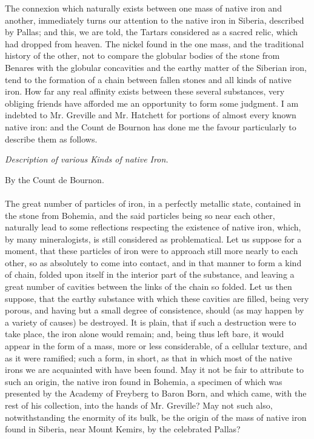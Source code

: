 \documentclass[a4paper, 12pt, oneside, twocolumn]{article}
\begin{document}
The connexion which naturally exists between one mass of native iron and another, immediately turns our attention to the native iron in Siberia, described by Pallas; and this, we are told, the Tartars considered as a sacred relic, which had dropped from heaven. The nickel found in the one mass, and the traditional history of the other, not to compare the globular bodies of the stone from Benares with the globular concavities and the earthy matter of the Siberian iron, tend to the formation of a chain between fallen stones and all kinds of native iron. How far any real affinity exists between these several substances, very obliging friends have afforded me an opportunity to form some judgment. I am indebted to Mr. Greville and Mr. Hatchett for portions of almost every known native iron: and the Count de Bournon has done me the favour particularly to describe them as follows.
\begin{center}
\emph{Description of various Kinds of native Iron.}
\end{center}
\begin{center}
By the Count de Bournon.
\end{center}
\paragraph{}
The great number of particles of iron, in a perfectly metallic state, contained in the stone from Bohemia, and the said particles being so near each other, naturally lead to some reflections respecting the existence of native iron, which, by many mineralogists, is still considered as problematical. Let us suppose for a moment, that these particles of iron were to approach still more nearly to each other, so as absolutely to come into contact, and in that manner to form a kind of chain, folded upon itself in the interior part of the substance, and leaving a great number of cavities between the links of the chain so folded. Let us then suppose, that the earthy substance with which these cavities are filled, being very porous, and having but a small degree of consistence, should (as may happen by a variety of causes) be destroyed. It is plain, that if such a destruction were to take place, the iron alone would remain; and, being thus left bare, it would appear in the form of a mass, more or less considerable, of a cellular texture, and as it were ramified; such a form, in short, as that in which most of the native irons we are acquainted with have been found. May it not be fair to attribute to such an origin, the native iron found in Bohemia, a specimen of which was presented by the Academy of Freyberg to Baron Born, and which came, with the rest of his collection, into the hands of Mr. Greville? May not such also, notwithstanding the enormity of its bulk, be the origin of the mass of native iron found in Siberia, near Mount Kemirs, by the celebrated Pallas?
\end{document}
